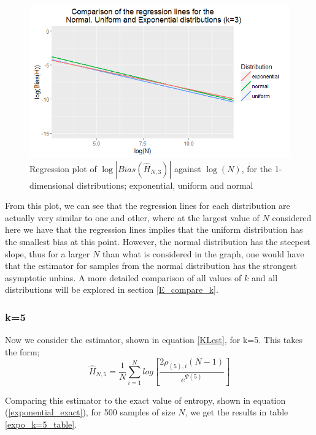 \documentclass{article}
\begin{document}
\begin{figure}
  \begin{center}
    \includegraphics[width=\textwidth]{./Graphs/EUN_k=3_plot.png}
  \end{center}
\caption{Regression plot of $\log|Bias(\hat{H}_{N, 3})|$ against $\log(N)$, for the 1-dimensional distributions; exponential, uniform and normal}
  \label{E_U_N_k=3_graph}
\end{figure}

From this plot, we can see that the regression lines for each distribution are actually very similar to one and other, where at the largest value of $N$ considered here we have that the regression lines implies that the uniform distribution has the smallest bias at this point. However, the normal distribution has the steepest slope, thus for a larger $N$ than what is considered in the graph, one would have that the estimator for samples from the normal distribution has the strongest asymptotic unbias. A more detailed comparison of all values of $k$ and all distributions will be explored in section \ref{E_compare_k}.



\subsubsection{k=5} \label{E_k=5}
Now we consider the estimator, shown in equation \ref{KLest}, for k=5. This takes the form;
\begin{equation}
\hat{H}_{N, 5} = \frac{1}{N} \sum_{i=1}^{N} log \left[ \frac{2\rho_{(5),i}(N-1)}{e^{\Psi(5)}} \right] \nonumber
\end{equation}

Comparing this estimator to the exact value of entropy, shown in equation (\ref{exponential_exact}), for 500 samples of size $N$, we get the results in table \ref{expo_k=5_table}. 
\end{document}
